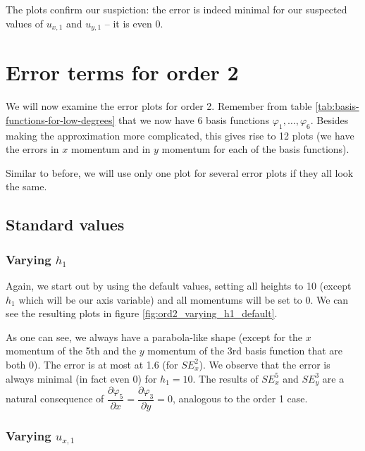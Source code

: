 \documentclass{article}
\newcommand{\pd}[2]{\dfrac{\partial #1}{\partial #2}}
\renewcommand{\phi}{\varphi}
\begin{document}


The plots confirm our suspiction: the error is indeed minimal for our suspected values of $u_{x,1}$ and $u_{y,1}$ -- it is even 0.

\clearpage{}

\section{Error terms for order 2}
\label{sec:stiffness-analyis-ord-2}

We will now examine the error plots for order 2. Remember from table \ref{tab:basis-functions-for-low-degrees} that we now have 6 basis functions $\phi_1,\dots,\phi_6$. Besides making the approximation more complicated, this gives rise to 12 plots (we have the errors in $x$ momentum and in $y$ momentum for each of the basis functions).

Similar to before, we will use only one plot for several error plots if they all look the same.

\subsection{Standard values}
\label{sec:stiffness-analyiss-ord2-default}

\subsubsection{\texorpdfstring{Varying $h_1$}{Varying h1}}
\label{sec:stiffness-analysis-ord2-default-var-h1}

Again, we start out by using the default values, setting all heights to 10 (except $h_1$ which will be our axis variable) and all momentums will be set to 0. We can see the resulting plots in figure \ref{fig:ord2_varying_h1_default}.



As one can see, we always have a parabola-like shape (except for the $x$ momentum of the 5th and the $y$ momentum of the 3rd basis function that are both 0). The error is at most at 1.6 (for $SE_x^2$). We observe that the error is always minimal (in fact even 0) for $h_1=10$. The results of $SE_x^5$ and $SE_y^3$ are a natural consequence of $\pd{\phi_5}{x}=\pd{\phi_3}{y}=0$, analogous to the order 1 case.

\subsubsection{\texorpdfstring{Varying $u_{x,1}$}{Varying ux1}}
\label{sec:stiffness-analysis-ord2-default-var-ux1}
\end{document}
